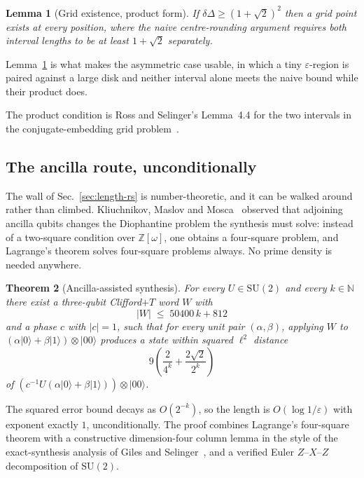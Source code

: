 \documentclass[aps,pra,reprint,nofootinbib,superscriptaddress]{revtex4-2}
\newcommand{\su}[1]{\mathrm{SU}(#1)}
\theoremstyle{plain}
\newtheorem{theorem}{Theorem}
\newtheorem{lemma}[theorem]{Lemma}
\theoremstyle{definition}
\begin{document}
\begin{lemma}[Grid existence, product form]
\label{lem:grid}
If $\delta\Delta \ge (1+\sqrt 2)^2$ then a grid point exists at every position,
where the naive centre-rounding argument requires \emph{both} interval lengths
to be at least $1+\sqrt 2$ separately.
\end{lemma}

Lemma~\ref{lem:grid} is what makes the asymmetric case usable, in which a tiny
$\varepsilon$-region is paired against a large disk and neither interval alone
meets the naive bound while their product does.

The product condition is Ross and Selinger's Lemma~4.4
for the two intervals in the conjugate-embedding grid
problem~\cite{RossSelinger2016}.

\subsection{The ancilla route, unconditionally}
\label{sec:length-kmm}

The wall of Sec.~\ref{sec:length-rs} is number-theoretic, and it can be walked
around rather than climbed. Kliuchnikov, Maslov and
Mosca~\cite{KMM2013ancilla} observed that adjoining ancilla qubits changes the
Diophantine problem the synthesis must solve: instead of a two-square condition
over $\mathbb Z[\omega]$, one obtains a four-square problem, and Lagrange's
theorem solves four-square problems always. No prime density is needed anywhere.

\begin{theorem}[Ancilla-assisted synthesis]
\label{thm:kmm}
For every $U \in \su 2$ and every $k \in \mathbb N$ there exist a three-qubit
Clifford$+T$ word $W$ with
\[
  \lvert W\rvert \;\le\; 50400\,k + 812
\]
and a phase $c$ with $\lvert c\rvert = 1$, such that for every unit pair
$(\alpha,\beta)$, applying $W$ to
$(\alpha\lvert 0\rangle + \beta\lvert 1\rangle)\otimes\lvert 00\rangle$
produces a state within squared $\ell^2$ distance
\[
  9\left(\frac{2}{4^k} + \frac{2\sqrt 2}{2^k}\right)
\]
of $(c^{-1}U(\alpha\lvert 0\rangle + \beta\lvert 1\rangle))\otimes\lvert 00\rangle$.
\end{theorem}

The squared error bound decays as $O(2^{-k})$, so the length is
$O(\log 1/\varepsilon)$ with exponent exactly $1$, unconditionally. The proof
combines Lagrange's four-square theorem with a constructive dimension-four
column lemma in the style of the exact-synthesis analysis of Giles and
Selinger~\cite{GilesSelinger2013}, and a verified Euler $Z$--$X$--$Z$
decomposition of $\su 2$.
\end{document}
